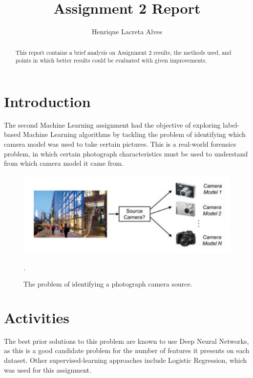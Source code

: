 \documentclass[10pt,twocolumn,letterpaper]{article}
\begin{document}
\title{Assignment 2 Report}
\author{Henrique Lacreta Alves
}

\maketitle
\begin{abstract}
This report contains a brief analysis on Assignment 2 results, the methods used, and points in which better results could be evaluated with given improvements.
\end{abstract}

\section{Introduction}
The second Machine Learning assignment had the objective of exploring label-based Machine Learning algorithms by tackling the problem of identifying which camera model was used to take certain pictures. This is a real-world forensics problem, in which certain photograph characteristics must be used to understand from which camera model it came from.

\begin{figure}[!ht]
\begin{center}
	\includegraphics[width=0.99\columnwidth]{pics/model}
	\caption{The problem of identifying a photograph camera source.}.\label{fig:label}  
\end{center} 
\end{figure}   

\section{Activities}
The best prior solutions to this problem are known to use Deep Neural Networks, as this is a good candidate problem for the number of features it presents on each dataset. Other supervised-learning approaches include Logistic Regression, which was used for this assignment.
\end{document}

